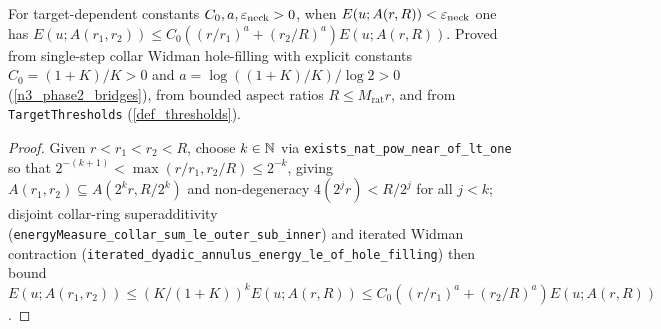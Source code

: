 \begin{theorem}
\label{cert_decay}
\leanok
{}
For target-dependent constants $C_0,a,\varepsilon_{\mathrm{neck}}>0$, when $E(u;A(r,R))<\varepsilon_{\mathrm{neck}}$
one has $E(u;A(r_1,r_2))\le C_0((r/r_1)^a+(r_2/R)^a)E(u;A(r,R))$.
Proved from single-step collar Widman hole-filling with explicit constants
$C_0=(1+K)/K>0$ and $a=\log((1+K)/K)/\log 2>0$ (\cref{n3_phase2_bridges}), from bounded aspect
ratios $R\le M_{\mathrm{rat}}r$, and from \texttt{TargetThresholds} (\cref{def_thresholds}).
\end{theorem}
\begin{proof}\leanok Given $r<r_1<r_2<R$, choose $k\in\mathbb{N}$ via \texttt{exists\_nat\_pow\_near\_of\_lt\_one}
so that $2^{-(k+1)}<\max(r/r_1,r_2/R)\le 2^{-k}$, giving $A(r_1,r_2)\subseteq A(2^k r,R/2^k)$ and
non-degeneracy $4(2^j r)<R/2^j$ for all $j<k$; disjoint collar-ring superadditivity
(\texttt{energyMeasure\_collar\_sum\_le\_outer\_sub\_inner}) and iterated Widman contraction
(\texttt{iterated\_dyadic\_annulus\_energy\_le\_of\_hole\_filling}) then bound
$E(u;A(r_1,r_2))\le (K/(1+K))^k E(u;A(r,R))\le C_0((r/r_1)^a+(r_2/R)^a)E(u;A(r,R))$.\end{proof}

